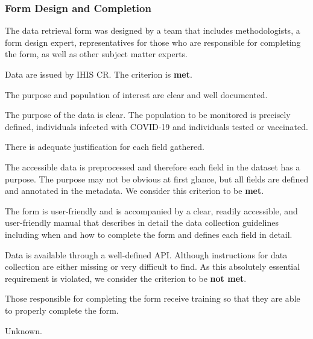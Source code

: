 \subsubsection{Form Design and Completion}

\begin{QandA}
    \item The data retrieval form was designed by a team that includes methodologists, a form design expert, representatives for those who are responsible for completing the form, as well as other subject matter experts.
    \begin{answered}
        Data are issued by IHIS CR.
        The criterion is \textbf{met}.
    \end{answered}

    \item The purpose and population of interest are clear and well documented.
    \begin{answered}
        The purpose of the data is clear.
        The population to be monitored is precisely defined, individuals infected with COVID-19 and individuals tested or vaccinated.
    \end{answered}

    \item There is adequate justification for each field gathered.
    \begin{answered}
        The accessible data is preprocessed and therefore each field in the dataset has a purpose.
        The purpose may not be obvious at first glance, but all fields are defined and annotated in the metadata. 
        We consider this criterion to be \textbf{met}.
    \end{answered}

    \item The form is user-friendly and is accompanied by a clear, readily accessible, and user-friendly manual that describes in detail the data collection guidelines including when and how to complete the form and defines each field in detail.
    \begin{answered}
        Data is available through a well-defined API.
        Although instructions for data collection are either missing or very difficult to find.
        As this absolutely essential requirement is violated, we consider the criterion to be \textbf{not met}.
    \end{answered}

    \item Those responsible for completing the form receive training so that they are able to properly complete the form.
    \begin{answered}
        Unknown.
    \end{answered}


\end{QandA}
